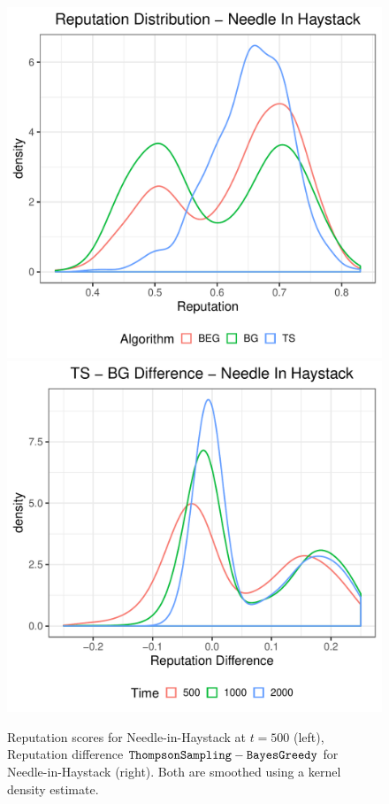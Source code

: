 \documentclass[../competing_bandits_with_appendix.tex]{subfiles}
\begin{document}
\begin{figure}[ht]
\centering
\includegraphics[scale=0.35]{ec19paper/figures/rep_distribution_nih}
\includegraphics[scale=0.35]{ec19paper/figures/ts_dg_rep_diff_nih}
\caption{\footnotesize Reputation scores for Needle-in-Haystack at $t=500$ (left), Reputation difference $\mathtt{ThompsonSampling} - \mathtt{BayesGreedy}$ for Needle-in-Haystack (right). Both are smoothed using a kernel density estimate.}
\label{fig:rep_dist_nih}
\end{figure}
\end{document}

